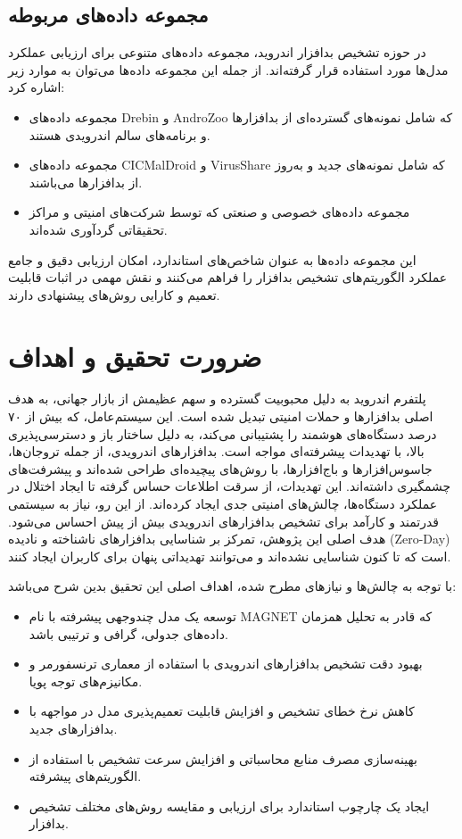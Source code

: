\subsection{مجموعه داده‌های مربوطه}
در حوزه تشخیص بدافزار اندروید، مجموعه داده‌های متنوعی برای ارزیابی عملکرد مدل‌ها مورد استفاده قرار گرفته‌اند. از جمله این مجموعه داده‌ها می‌توان به موارد زیر اشاره کرد:
\begin{itemize}
    \item مجموعه داده‌های Drebin \cite{Drebin} و AndroZoo \cite{AndroZoo} که شامل نمونه‌های گسترده‌ای از بدافزارها و برنامه‌های سالم اندرویدی هستند.
    \item مجموعه داده‌های CICMalDroid \cite{CICMalDroid} و VirusShare که شامل نمونه‌های جدید و به‌روز از بدافزارها می‌باشند.
    \item مجموعه داده‌های خصوصی و صنعتی که توسط شرکت‌های امنیتی و مراکز تحقیقاتی گردآوری شده‌اند.
\end{itemize}
این مجموعه داده‌ها به عنوان شاخص‌های استاندارد، امکان ارزیابی دقیق و جامع عملکرد الگوریتم‌های تشخیص بدافزار را فراهم می‌کنند و نقش مهمی در اثبات قابلیت تعمیم و کارایی روش‌های پیشنهادی دارند.

\section{ضرورت تحقیق و اهداف}\label{import}
پلتفرم اندروید به دلیل محبوبیت گسترده و سهم عظیمش از بازار جهانی، به هدف اصلی بدافزارها و حملات امنیتی تبدیل شده است. این سیستم‌عامل، که بیش از ۷۰ درصد دستگاه‌های هوشمند را پشتیبانی می‌کند، به دلیل ساختار باز و دسترسی‌پذیری بالا، با تهدیدات پیشرفته‌ای مواجه است. بدافزارهای اندرویدی، از جمله تروجان‌ها، جاسوس‌افزارها و باج‌افزارها، با روش‌های پیچیده‌ای طراحی شده‌اند و پیشرفت‌های چشمگیری داشته‌اند. این تهدیدات، از سرقت اطلاعات حساس گرفته تا ایجاد اختلال در عملکرد دستگاه‌ها، چالش‌های امنیتی جدی ایجاد کرده‌اند. از این رو، نیاز به سیستمی قدرتمند و کارآمد برای تشخیص بدافزارهای اندرویدی بیش از پیش احساس می‌شود. هدف اصلی این پژوهش، تمرکز بر شناسایی بدافزارهای ناشناخته و نادیده (Zero-Day) است که تا کنون شناسایی نشده‌اند و می‌توانند تهدیداتی پنهان برای کاربران ایجاد کنند.

با توجه به چالش‌ها و نیازهای مطرح شده، اهداف اصلی این تحقیق بدین شرح می‌باشد:
\begin{itemize}
    \item توسعه یک مدل چندوجهی پیشرفته با نام MAGNET که قادر به تحلیل همزمان داده‌های جدولی، گرافی و ترتیبی باشد.
    \item بهبود دقت تشخیص بدافزارهای اندرویدی با استفاده از معماری ترنسفورمر و مکانیزم‌های توجه پویا.
    \item کاهش نرخ خطای تشخیص و افزایش قابلیت تعمیم‌پذیری مدل در مواجهه با بدافزارهای جدید.
    \item بهینه‌سازی مصرف منابع محاسباتی و افزایش سرعت تشخیص با استفاده از الگوریتم‌های پیشرفته.
    \item ایجاد یک چارچوب استاندارد برای ارزیابی و مقایسه روش‌های مختلف تشخیص بدافزار.
\end{itemize}

